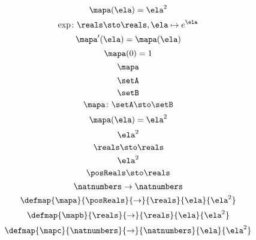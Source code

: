 \begin{forslides}
    \begin{equation}
        \label{eq:slides_session2_76}
        \mapa(\ela)=\ela^2
    \end{equation}
    \begin{equation}
        \label{eq:slides_session2_77}
        \exp \colon \reals \sto \reals, \ela \mapsto e^\ela
    \end{equation}
    \begin{equation}
        \label{eq:slides_session2_78}
        \mapa'(\ela) = \mapa(\ela)
    \end{equation}
    \begin{equation}
        \label{eq:slides_session2_79}
        \mapa(0) =1
    \end{equation}
    \begin{equation}
        \label{eq:slides_session2_80}
        \mapa
    \end{equation}
    \begin{equation}
        \label{eq:slides_session2_81}
        \setA
    \end{equation}
    \begin{equation}
        \label{eq:slides_session2_82}
        \setB
    \end{equation}
    \begin{equation}
        \label{eq:slides_session2_83}
        \mapa\colon \setA \sto \setB
    \end{equation}
    \begin{equation}
        \label{eq:slides_session2_84}
        \mapa(\ela)=\ela^2
    \end{equation}
    \begin{equation}
        \label{eq:slides_session2_85}
        \ela^2
    \end{equation}
    \begin{equation}
        \label{eq:slides_session2_86}
        \reals \sto \reals
    \end{equation}
    \begin{equation}
        \label{eq:slides_session2_87}
        \ela^2
    \end{equation}
    \begin{equation}
        \label{eq:slides_session2_88}
        \posReals \sto \reals
    \end{equation}
    \begin{equation}
        \label{eq:slides_session2_89}
        \natnumbers \to \natnumbers
    \end{equation}
    \begin{equation}
        \label{eq:slides_session2_90}
        \defmap{\mapa}{\posReals}{\to}{\reals}{\ela}{\ela^2}
    \end{equation}
    \begin{equation}
        \label{eq:slides_session2_91}
        \defmap{\mapb}{\reals}{\to}{\reals}{\ela}{\ela^2}
    \end{equation}
    \begin{equation}
        \label{eq:slides_session2_92}
        \defmap{\mapc}{\natnumbers}{\to}{\natnumbers}{\ela}{\ela^2}
    \end{equation}


\end{forslides}
